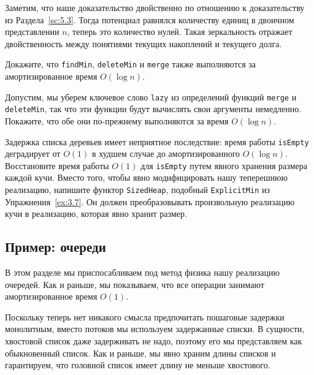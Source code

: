 \begin{remark}
  Заметим, что наше доказательство двойственно по отношению к
  доказательству из Раздела~\ref{sc:5.3}. Тогда
  потенциал равнялся количеству единиц в двоичном представлении $n$,
  теперь это количество нулей. Такая зеркальность отражает двойственность
  между понятиями текущих накоплений и текущего долга.
\end{remark}

\begin{exercise}\label{ex:6.3}
  Докажите, что \lstinline!findMin!, \lstinline!deleteMin! и
  \lstinline!merge! также выполняются за амортизированное время
  $O(\log n)$.
\end{exercise}

\begin{exercise}\label{ex:6.4}
  Допустим, мы уберем ключевое слово \lstinline!lazy! из определений
  функций \lstinline!merge! и \lstinline!deleteMin!, так что эти
  функции будут вычислять свои аргументы немедленно. Покажите, что обе
  они по-прежнему выполняются за время $O(\log n)$.
\end{exercise}

\begin{exercise}\label{ex:6.5}
  Задержка списка деревьев имеет неприятное последствие: время работы
  \lstinline!isEmpty! деградирует от $O(1)$ в худшем случае до
  амортизированного $O(\log n)$. Восстановите время работы $O(1)$ для
  \lstinline!isEmpty! путем явного хранения размера каждой
  кучи.  Вместо того, чтобы явно модифицировать нашу теперешнюю
  реализацию, напишите функтор \lstinline!SizedHeap!, подобный
  \lstinline!ExplicitMin! из Упражнения~\ref{ex:3.7}. Он должен
  преобразовывать произвольную реализацию кучи в реализацию, которая
  явно хранит размер.
\end{exercise}

\subsection{Пример: очереди}
\label{sc:6.4.2}

В этом разделе мы приспосабливаем под метод физика нашу реализацию
очередей. Как и раньше, мы показываем, что все операции занимают
амортизированное время $O(1)$.

Поскольку теперь нет никакого смысла предпочитать пошаговые задержки
монолитным, вместо потоков мы используем задержанные списки. В
сущности, хвостовой список даже задерживать не надо, поэтому его мы
представляем как обыкновенный список.  Как и раньше, мы явно храним
длины списков и гарантируем, что головной список имеет длину не меньше
хвостового. 

